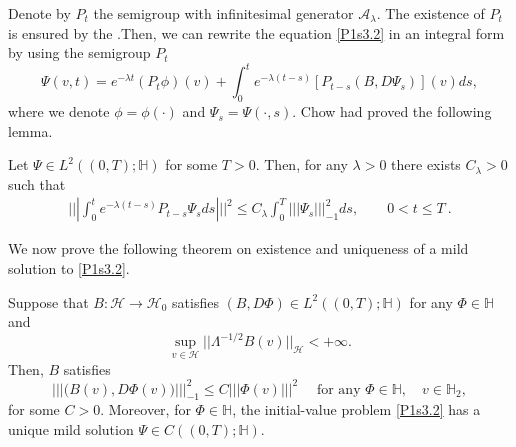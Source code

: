 \documentclass[review,onefignum,onetabnum]{siamart190516}
\begin{document}
        Denote by $P_t$ the semigroup with infinitesimal generator
    $\mathcal{A}_\lambda$. The existence of $P_t$ is ensured by the
    .Then, we can rewrite the equation \eqref{P1s3.2} in an 
    integral form by using the semigroup $P_t$
    \begin{equation}
        \Psi(v,t)=
            e^{-\lambda t} (P_t\phi)(v)
            +
            \int_0^t  e^{-\lambda(t-s)}[P_{t-s}(B,D\Psi_s)](v) ds,
    \end{equation}
    where we denote $\phi=\phi(\cdot)$ and $\Psi_s=\Psi(\cdot,s)$.
    Chow \cite{liu} had proved the following lemma.

    \begin{lemma}\label{Lemma.s3.1}
        Let $\Psi\in L^2((0,T);\mathbb{H})$ for some $T>0$. Then, for any
        $\lambda>0$ there exists $C_\lambda>0$ such that
         \begin{align}
            |||\int_0^t e^{-\lambda (t-s)} P_{t-s} \Psi_{s} ds |||^2 \le 
            C_\lambda
            \int_0^T |||\Psi_s|||_{-1}^2 ds,
            \qquad 0< t\le T
            \ .
            \label{s3.1.0}
         \end{align}
    \end{lemma}

    We now prove the following theorem on existence and uniqueness of a mild
    solution to \eqref{P1s3.2}.
    \begin{theorem}
        \label{Th-EU}
        Suppose that $B:\mathcal{H}\rightarrow \mathcal{H}_0$ satisfies
        $
            (B,D\Phi)\in
            L^2((0,T);\mathbb{H})
        $ for any $\Phi\in\mathbb{H}$ and
        $$
            \sup_{v\in \mathcal{H}} ||\Lambda^{-1/2}B(v)||_{\mathcal{H}}
                <+\infty.
        $$
        Then, $B$ satisfies
        \begin{equation}
            \label{s3.1.1}
            ||| \big(B(v),D\Phi(v) \big) |||_{-1}^2 
            \le C |||\Phi(v) |||^2  
            \quad
            \text{ for any } \Phi\in \mathbb{H},
            \quad v\in \mathbb{H}_2 ,
        \end{equation}
        for some $C>0$.
        Moreover, for $\Phi\in \mathbb{H}$, the initial-value problem
        \eqref{P1s3.2} has a unique mild solution
        $\Psi\in C((0,T); \mathbb{H})$.
    \end{theorem}
\end{document}
